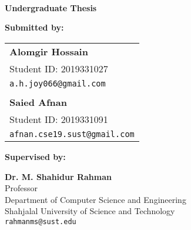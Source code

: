 \begin{titlepage}
    \centering
    \vspace{1cm}
    
    
    \vspace{1cm}
    
    {\large \textbf{\thesisinstitution}}\\
    {\large \textbf{\thesisdepartment}}\\
    
    \vspace{2cm}
    
    {\huge \textbf{\thesistitle}}\\
    
    \vspace{1.5cm}
    
    {\Large \textbf{Undergraduate Thesis}}\\
    
    \vspace{1.5cm}
    
    {\large \textbf{Submitted by:}}\\
    \vspace{0.5cm}
    
    \begin{tabular}{l}
        \textbf{Alomgir Hossain} \\
        Student ID: 2019331027 \\
        \texttt{a.h.joy066@gmail.com} \\
        \\
        \textbf{Saied Afnan} \\
        Student ID: 2019331091 \\
        \texttt{afnan.cse19.sust@gmail.com} \\
    \end{tabular}
    
    \vspace{1.5cm}
    
    {\large \textbf{Supervised by:}}\\
    \vspace{0.5cm}
    
    \textbf{Dr. M. Shahidur Rahman}\\
    Professor\\
    Department of Computer Science and Engineering\\
    Shahjalal University of Science and Technology\\
    \texttt{rahmanms@sust.edu}\\
    

\end{titlepage}
